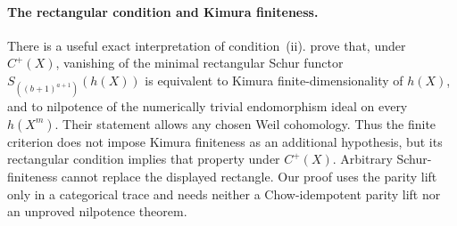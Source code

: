 \paragraph{The rectangular condition and Kimura finiteness.}
There is a useful exact interpretation of condition~(ii).
\citet[Theorem~3.2, p.~286]{c_delpadronemazza2005}
prove that, under $C^+(X)$, vanishing of the minimal rectangular
Schur functor $S_{((b+1)^{a+1})}(h(X))$ is equivalent to
Kimura finite-dimensionality of $h(X)$, and to nilpotence of the
numerically trivial endomorphism ideal on every $h(X^m)$.
Their statement allows any chosen Weil cohomology.
Thus the finite criterion does not impose Kimura finiteness as
an additional hypothesis, but its rectangular condition implies
that property under $C^+(X)$.  Arbitrary Schur-finiteness cannot
replace the displayed rectangle.  Our proof uses the parity lift
only in a categorical trace and needs neither a Chow-idempotent
parity lift nor an unproved nilpotence theorem.
